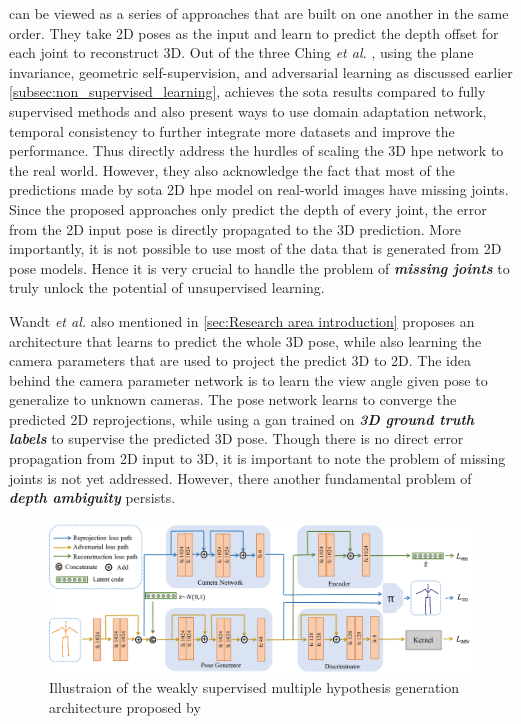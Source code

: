 \cite{unsupervisedAdversarial, can3dpose, amazon1} can be viewed as a series of approaches that are built on one another in the same order. They take 2D poses as the input and learn to predict the depth offset for each joint to reconstruct 3D. Out of the three Ching \textit{et al.} \cite{amazon1}, using the plane invariance, geometric self-supervision, and adversarial learning as discussed earlier \ref{subsec:non_supervised_learning}, achieves the \ac{sota} results compared to fully supervised methods and also present ways to use domain adaptation network, temporal consistency to further integrate more datasets and improve the performance. Thus directly address the hurdles of scaling the 3D \ac{hpe} network to the real world. However, they also acknowledge the fact that most of the predictions made by \ac{sota} 2D \ac{hpe} model on real-world images have missing joints. Since the proposed approaches only predict the depth of every joint, the error from the 2D input pose is directly propagated to the 3D prediction. More importantly, it is not possible to use most of the data that is generated from 2D pose models. Hence it is very crucial to handle the problem of \textit{\textbf{missing joints}} to truly unlock the potential of unsupervised learning.

Wandt \textit{et al.} \cite{repnet} also mentioned in \ref{sec:Research area introduction} proposes an architecture that learns to predict the whole 3D pose, while also learning the camera parameters that are used to project the predict 3D to 2D. The idea behind the camera parameter network is to learn the view angle given pose to generalize to unknown cameras. The pose network learns to converge the predicted 2D reprojections, while using a \ac{gan} trained on \textit{\textbf{3D ground truth labels}} to supervise the predicted 3D pose. Though there is no direct error propagation from 2D input to 3D, it is important to note the problem of missing joints is not yet addressed. However, there another fundamental problem of \textit{\textbf{depth ambiguity}} persists. 

\begin{figure}[!h]
    \centering
    \includegraphics[width=\linewidth]{figures/background/multi_arch.pdf}
    \caption{Illustraion of the weakly supervised multiple hypothesis generation architecture proposed by \cite{weaklymultiple}}
    \label{fig:multi_arch}
\end{figure}


